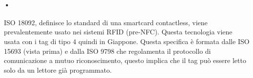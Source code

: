 \paragraph{•} ISO 18092, definisce lo standard di una smartcard contactless, viene prevalentemente usato nei sistemi RFID (pre-NFC). Questa tecnologia  viene usata con i tag di tipo 4 quindi in Giappone. Questa specifica è formata dalle ISO 15693 (vista prima) e dalla ISO 9798 che regolamenta il protocollo di comunicazione a mutuo riconoscimento, questo implica che il tag può essere letto solo da un lettore già programmato.




